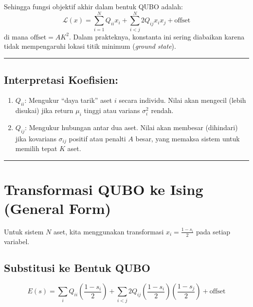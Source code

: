\documentclass[12pt,a4paper]{article}
\providecommand{\tightlist}{%
  \setlength{\itemsep}{0pt}\setlength{\parskip}{0pt}}
\begin{document}
Sehingga fungsi objektif akhir dalam bentuk QUBO adalah: \[ \mathcal{L}(x) = \sum_{i=1}^N Q_{ii} x_i + \sum_{i < j}^N 2Q_{ij} x_i x_j + \text{offset} \] di mana \(\text{offset} = AK^2\). Dalam prakteknya, konstanta ini sering diabaikan karena tidak mempengaruhi lokasi titik minimum (\emph{ground state}).

\begin{center}\rule{0.5\linewidth}{0.5pt}\end{center}

\hypertarget{interpretasi-koefisien}{%
\subsection{Interpretasi Koefisien:}\label{interpretasi-koefisien}}

\begin{enumerate}
\def\labelenumi{\arabic{enumi}.}
\tightlist
\item
  \textbf{\(Q_{ii}\)}: Mengukur ``daya tarik'' aset \(i\) secara individu. Nilai akan mengecil (lebih disukai) jika return \(\mu_i\) tinggi atau varians \(\sigma_i^2\) rendah.
\item
  \textbf{\(Q_{ij}\)}: Mengukur hubungan antar dua aset. Nilai akan membesar (dihindari) jika kovarians \(\sigma_{ij}\) positif atau penalti \(A\) besar, yang memaksa sistem untuk memilih tepat \(K\) aset.
\end{enumerate}

\begin{center}\rule{0.5\linewidth}{0.5pt}\end{center}

\hypertarget{transformasi-qubo-ke-ising-general-form}{%
\section{Transformasi QUBO ke Ising (General Form)}\label{transformasi-qubo-ke-ising-general-form}}

Untuk sistem \(N\) aset, kita menggunakan transformasi \(x_i = \frac{1 - s_i}{2}\) pada setiap variabel.

\hypertarget{langkah-1-substitusi-ke-bentuk-qubo}{%
\subsection{Substitusi ke Bentuk QUBO}\label{langkah-1-substitusi-ke-bentuk-qubo}}

\[ E(s) = \sum_i Q_{ii} \left( \frac{1-s_i}{2} \right) + \sum_{i<j} 2Q_{ij} \left( \frac{1-s_i}{2} \right) \left( \frac{1-s_j}{2} \right) + \text{offset} \]
\end{document}
